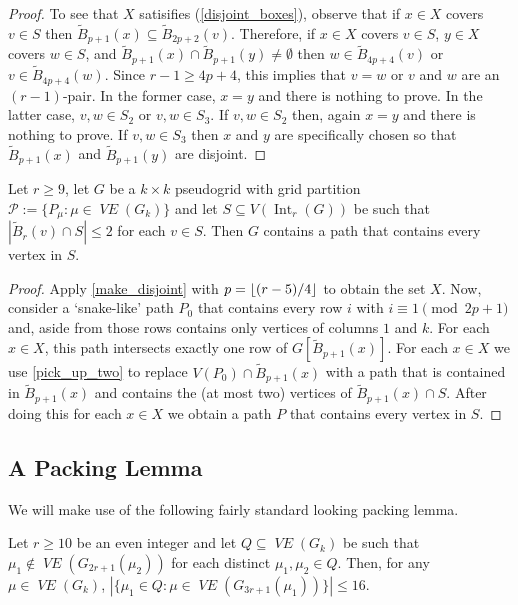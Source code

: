 \documentclass{patmorin}
\DeclareMathOperator{\interior}{Int}
\DeclareMathOperator{\VE}{\mathit{VE}}
\begin{document}
\begin{proof}
  To see that $X$ satisifies (\ref{disjoint_boxes}), observe that if $x\in X$ covers $v\in S$ then $\tilde{B}_{p+1}(x)\subseteq \tilde{B}_{2p+2}(v)$. Therefore, if $x\in X$ covers $v\in S$,  $y\in X$ covers $w\in S$, and $\tilde{B}_{p+1}(x)\cap \tilde{B}_{p+1}(y)\neq\emptyset$ then $w\in \tilde{B}_{4p+4}(v)$ or $v\in \tilde{B}_{4p+4}(w)$.  Since $r-1 \ge 4p+4$, this implies that $v=w$ or $v$ and $w$ are an $(r-1)$-pair.  In the former case, $x=y$ and there is nothing to prove. In the latter case, $v,w\in S_2$ or $v,w\in S_3$.  If $v,w\in S_2$ then, again $x=y$ and there is nothing to prove.  If $v,w\in S_3$ then $x$ and $y$ are specifically chosen so that $\tilde{B}_{p+1}(x)$ and $\tilde{B}_{p+1}(y)$ are disjoint.
\end{proof}


\begin{lem}\label{pick_up_everything}
  Let $r\ge 9$, let $G$ be a $k\times k$ pseudogrid with grid partition $\mathcal{P}:=\{P_\mu:\mu\in\VE(G_k)\}$ and let $S\subseteq V(\interior_r(G))$ be such that $|\tilde{B}_{r}(v)\cap S|\le 2$ for each $v\in S$. Then $G$ contains a path that contains every vertex in $S$.
\end{lem}

\begin{proof}
  Apply \cref{make_disjoint} with $p={\lfloor (r-5)/4 \rfloor}$ to obtain the set $X$.  Now, consider a `snake-like' path $P_0$ that contains every row $i$ with $i\equiv 1\pmod{2p+1}$ and, aside from those rows contains only vertices of columns $1$ and $k$.   For each $x\in X$, this path intersects exactly one row of $G[\tilde{B}_{p+1}(x)]$.  For each $x\in X$ we use \cref{pick_up_two} to replace $V(P_0)\cap \tilde{B}_{p+1}(x)$ with a path that is contained in $\tilde{B}_{p+1}(x)$ and contains the (at most two) vertices of $\tilde{B}_{p+1}(x)\cap S$.  After doing this for each $x\in X$ we obtain a path $P$ that contains every vertex in $S$.
\end{proof}

\subsection{A Packing Lemma}
\label{packing_lemma_sec}

We will make use of the following fairly standard looking packing lemma.

\begin{lem}\label{packing_lemma}
  Let $r\ge 10$ be an even integer and let $Q\subseteq \VE(G_k)$ be such that $\mu_1\not\in \VE(G_{2r+1}(\mu_2))$ for each distinct $\mu_1,\mu_2\in Q$.  Then, for any $\mu\in \VE(G_k)$,
  $|\{\mu_1\in Q: \mu\in \VE(G_{3r+1}(\mu_1))\}| \le 16$.
\end{lem}
\end{document}
